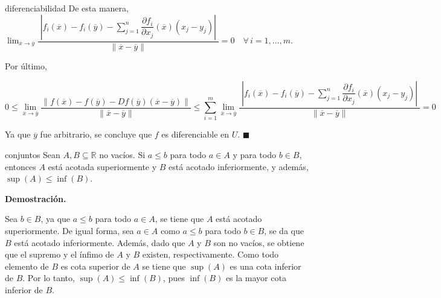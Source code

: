 \documentclass[12pt]{article}
\newenvironment{ejercicio}[1]{\begin{ejer}[breakable, pad at break = 5mm, leftrule = 0.7mm, rightrule = 0.7mm, right = 2mm, left = 2mm, enlarge bottom finally by = 3mm, fontlower = \setlength{\parskip}{2mm}]{}{#1}}{\end{ejer}}
\newcommand{\real}{\mathbb{R}}
\begin{document}
\begin{ejercicio}{diferenciabilidad}
		De esta manera, $ \displaystyle \lim_{\overline{x} \to \overline{y}} \dfrac{ \phantom{|} \left\lvert f_i(\overline{x}) - f_i(\overline{y}) - \displaystyle \sum_{j=1}^{n} \dfrac{\partial f_i}{\partial x_j} (\overline{x}) \left( x_j - y_j \right) \right\rvert \phantom{|}}{ \left\lVert \overline{x} - \overline{y} \right\rVert } = 0 \quad \forall \, i = 1, \ldots, m $.

		Por último, 

		\begin{equation*}
			0 \leq \lim_{\overline{x} \to \overline{y}} \dfrac{ \left\lVert f(\overline{x}) - f(\overline{y}) - Df(\overline{y}) \left( \overline{x} - \overline{y} \right) \right\rVert }{ \left\lVert \overline{x} - \overline{y} \right\rVert } \leq \sum_{i=1}^{m} \lim_{\overline{x} \to \overline{y}} \dfrac{ \phantom{|} \left\lvert f_i(\overline{x}) - f_i(\overline{y}) - \displaystyle \sum_{j=1}^{n} \dfrac{\partial f_i}{\partial x_j} (\overline{x}) \left( x_j - y_j \right) \right\rvert \phantom{|}}{ \left\lVert \overline{x} - \overline{y} \right\rVert } = 0
		\end{equation*}

		Ya que $ \overline{y} $ fue arbitrario, se concluye que $ f $ es diferenciable en $ U $. \hfill $ \blacksquare $
	\end{ejercicio}


	\begin{ejercicio}{conjuntos}
		Sean $ A, B \subseteq \real $ no vacíos. Si $ a \leq b $ para todo $ a \in A $ y para todo $ b \in B $, entonces $ A $ está acotada superiormente y $ B $ está acotado inferiormente, y además, $ \sup (A) \leq \inf (B) $.

		\tcblower
		
		\textbf{Demostración.} 

		Sea $ b \in B $, ya que $ a \leq b $ para todo $ a \in A $, se tiene que $ A $ está acotado superiormente. De igual forma, sea $ a \in A $ como $ a \leq b $ para todo $ b \in B $, se da que $ B $ está acotado inferiormente. Además, dado que $ A $ y $ B $ son no vacíos, se obtiene que el supremo y el ínfimo de $ A $ y $ B $ existen, respectivamente. Como todo elemento de $ B $ es cota superior de $ A $ se tiene que $ \sup (A) $ es una cota inferior de $ B $. Por lo tanto, $ \sup (A) \leq \inf (B) $, pues $ \inf(B) $ es la mayor cota inferior de $ B $.
	\end{ejercicio}
	
\end{document}
